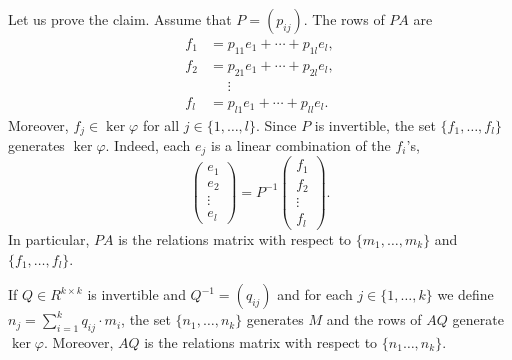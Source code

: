 Let us prove the claim. Assume that $P=(p_{ij})$. The rows of $PA$ are 
\begin{align*}
f_1 &= p_{11}e_1+\cdots+p_{1l}e_l,\\
f_2 &= p_{21}e_1+\cdots+p_{2l}e_l,\\
&\phantom{=}\vdots\\
f_l &= p_{l1}e_1+\cdots+p_{ll}e_l.	
\end{align*}
Moreover, $f_j\in\ker\varphi$ for all $j\in\{1,\dots,l\}$. 
Since $P$ is invertible, the set $\{f_1,\dots,f_l\}$ generates $\ker\varphi$. Indeed, each 
$e_j$ is a linear combination of the $f_i$'s,  
\[
\begin{pmatrix}
e_1\\
e_2\\
\vdots\\
e_l	
\end{pmatrix}
=P^{-1}\begin{pmatrix}
f_1\\
f_2\\
\vdots\\
f_l
\end{pmatrix}.
\]
In particular, $PA$ is the relations matrix with respect to 
$\{m_1,\dots,m_k\}$ and $\{f_1,\dots,f_l\}$.  

\begin{claim}
	If $Q\in R^{k\times k}$ is invertible and $Q^{-1}=(q_{ij})$ and for each
	$j\in\{1,\dots,k\}$ we define $n_j=\sum_{i=1}^k q_{ij}\cdot m_i$, the set
	$\{n_1,\dots,n_k\}$ generates $M$ and the rows of $AQ$ generate
	$\ker\varphi$. Moreover, $AQ$ is the relations matrix with respect to
	$\{n_1\dots,n_k\}$.  
\end{claim}

